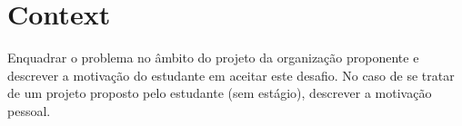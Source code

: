 \section{Context} %
\label{sec:context}
Enquadrar o problema no âmbito do projeto da organização proponente e descrever a motivação do estudante em aceitar este desafio. No caso de se tratar de um projeto proposto pelo estudante (sem estágio), descrever a motivação pessoal.

